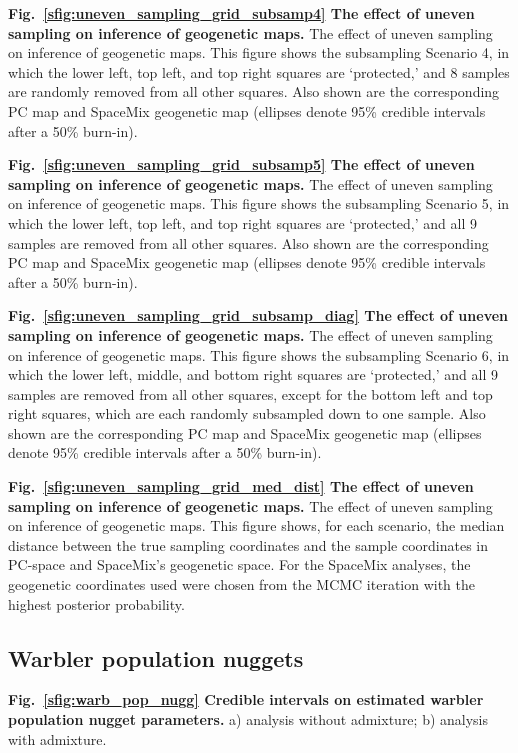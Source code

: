 \documentclass[10pt,letterpaper]{article}
\begin{document}
\label{sfig:uneven_sampling_grid_subsamp4}
{\bf{Fig.\ \ref{sfig:uneven_sampling_grid_subsamp4}}
	The effect of uneven sampling on inference of geogenetic maps.}
	The effect of uneven sampling on inference of geogenetic maps.  
	This figure shows the subsampling Scenario 4, 
	in which the lower left, top left, and top right squares are `protected,'
	and 8 samples are randomly removed from all other squares.
	Also shown are the corresponding PC map and 
	SpaceMix geogenetic map 
	(ellipses denote 95\% credible intervals after a 50\% burn-in).
			
\label{sfig:uneven_sampling_grid_subsamp5}
{\bf{Fig.\ \ref{sfig:uneven_sampling_grid_subsamp5}}
	The effect of uneven sampling on inference of geogenetic maps.}
	The effect of uneven sampling on inference of geogenetic maps.  
	This figure shows the subsampling Scenario 5, 
	in which the lower left, top left, and top right squares are `protected,'
	and all 9 samples are removed from all other squares.
	Also shown are the corresponding PC map and 
	SpaceMix geogenetic map 
	(ellipses denote 95\% credible intervals after a 50\% burn-in).
			
\label{sfig:uneven_sampling_grid_subsamp_diag}
{\bf{Fig.\ \ref{sfig:uneven_sampling_grid_subsamp_diag}}
	The effect of uneven sampling on inference of geogenetic maps.}
	The effect of uneven sampling on inference of geogenetic maps.  
	This figure shows the subsampling Scenario 6, 
	in which the lower left, middle, and bottom right squares are `protected,'
	and all 9 samples are removed from all other squares, 
	except for the bottom left and top right squares, which are each 
	randomly subsampled down to one sample.
	Also shown are the corresponding PC map and 
	SpaceMix geogenetic map 
	(ellipses denote 95\% credible intervals after a 50\% burn-in).
			
\label{sfig:uneven_sampling_grid_med_dist}
{\bf{Fig.\ \ref{sfig:uneven_sampling_grid_med_dist}}
	The effect of uneven sampling on inference of geogenetic maps.}
	The effect of uneven sampling on inference of geogenetic maps.  
	This figure shows, for each scenario, the median distance 
	between the true sampling coordinates and the sample coordinates 
	in PC-space and SpaceMix's geogenetic space.  For the SpaceMix 
	analyses, the geogenetic coordinates used were chosen from the 
	MCMC iteration with the highest posterior probability.

\subsection*{Warbler population nuggets}
\label{warb_pop_nugg}
{\bf{Fig.\ \ref{sfig:warb_pop_nugg} Credible intervals on estimated warbler population nugget parameters.}} a) analysis without admixture; b) analysis with admixture.
\end{document}
